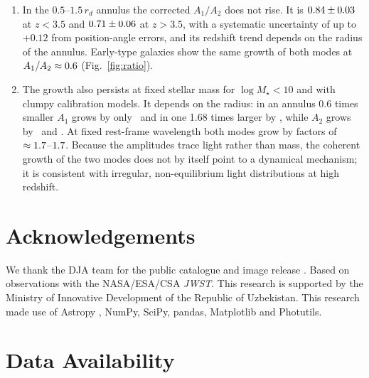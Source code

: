 \documentclass[fleqn,usenatbib]{mnras}
\newcommand{\JWST}{\textit{JWST}}
\newcommand{\Mstar}{M_\star}
\begin{document}
\begin{enumerate}
\item In the $0.5$--$1.5\,r_d$ annulus the corrected $A_1/A_2$ does not rise.
It is $0.84\pm0.03$ at $z<3.5$ and
$0.71\pm0.06$ at $z>3.5$, with a systematic uncertainty of up to
$+0.12$ from position-angle errors, and its redshift trend depends on the radius
of the annulus. Early-type galaxies show the same growth of both modes at
$A_1/A_2\approx0.6$ (Fig.~\ref{fig:ratio}).

\item The growth also persists at fixed stellar mass for $\log\Mstar<10$ and
with clumpy calibration models. It depends on the radius: in an annulus 0.6
times smaller $A_1$ grows by only \numAnnSmallOne\ and in one 1.68 times larger
by \numAnnLargeOne, while $A_2$ grows by \numAnnSmallTwo\ and \numAnnLargeTwo. At fixed rest-frame
wavelength both modes grow by factors of $\approx1.7$--$1.7$.
Because the amplitudes trace light rather than mass, the coherent growth of the
two modes does not by itself point to a dynamical mechanism; it is consistent
with irregular, non-equilibrium light distributions at high redshift.

\end{enumerate}


\section*{Acknowledgements}

We thank the DJA team for the public catalogue and image release
\citep{Valentino2023}. Based on observations with the NASA/ESA/CSA
\JWST. This research is supported by the Ministry of Innovative
Development of the Republic of Uzbekistan. This research made use of
Astropy \citep{astropy2022}, NumPy, SciPy, pandas, Matplotlib and Photutils.

\section*{Data Availability}
\end{document}

